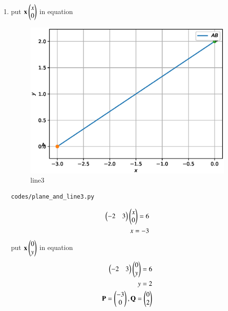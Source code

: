 \begin{enumerate}[label=\arabic*.,ref=\thesubsection.\theenumi]
\begin{enumerate}
\item put $\mathbf x \begin{pmatrix}x\\0\end{pmatrix}$ in equation 
\begin{figure}[!ht]
	\centering
	\includegraphics[width=\columnwidth]{./figures/plane_and_line3.eps}
	\caption{line3 }
	\label{fig:line3}
\end{figure}
\begin{lstlisting}
codes/plane_and_line3.py
\end{lstlisting}
\begin{align}
\begin{pmatrix}-2 & 3\end{pmatrix}\begin{pmatrix}x\\0\end{pmatrix} = 6
\\
x= -3
\end{align}
put $\mathbf x \begin{pmatrix}0\\y\end{pmatrix}$ in equation
\\
\begin{align}
\begin{pmatrix}-2 & 3\end{pmatrix}\begin{pmatrix}0\\y\end{pmatrix} = 6
\\
y= 2
\\
\mathbf{P} = \begin{pmatrix}-3\\0\end{pmatrix}, \mathbf{Q} = \begin{pmatrix}0\\2\end{pmatrix}
\end{align}





\end{enumerate}
\end{enumerate}
